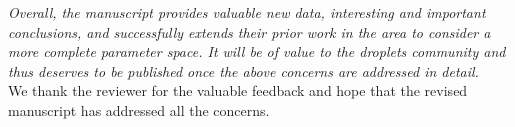 \documentclass[]{article}
\begin{document}
\textit{Overall, the manuscript provides valuable new data, interesting and important conclusions, and successfully extends their prior work in the area to consider a more complete parameter space. It will be of value to the droplets community and thus deserves to be published once the above concerns are addressed in detail.}\\[0.5mm]

We thank the reviewer for the valuable feedback and hope that the revised manuscript has addressed all the concerns.

	
\printbibliography[title=References]
\end{document}
